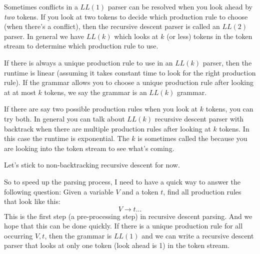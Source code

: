 Sometimes conflicts in a $LL(1)$ parser can be resolved when you look ahead
by \textit{two} tokens.
If you look at two tokens to decide which
production rule to choose (when there's a conflict),
then the recursive descent parser is called an $LL(2)$ parser.
In general we have $LL(k)$ which looks at $k$ (or less) tokens in the
token stream to determine which production rule to use.

If there is always a unique production rule to use in an $LL(k)$
parser, then the runtime is linear (assuming it takes constant time
to look for the right production rule).
If the grammar allows you to choose a unique production rule
after looking at at most $k$ tokens, we say the grammar is an
$LL(k)$ grammar.

If there are say two possible production rules when you look at
$k$ tokens, you can try both.
In general you can talk about $LL(k)$ recursive descent parser
with backtrack when there are multiple production rules
after looking at $k$ tokens.
In this case the runtime is exponential.
The $k$ is sometimes called the 
because you are looking into the token stream to see what's coming.

Let's stick to non-backtracking recursive descent for now.

So to speed up the parsing process, I need to have a quick way to answer
the following question:
Given a variable $V$ and a token $t$, find all production rules
that look like this:
\[
V \rightarrow t ...
\]
This is the first step (a pre-processing step) in recursive descent parsing.
And we hope that this can be done quickly.
If there is a unique production rule for all occurring
$V,t$, then the grammar is $LL(1)$ and we can write a recursive
descent parser that looks at only one token (look ahead is 1)
in the token stream.

